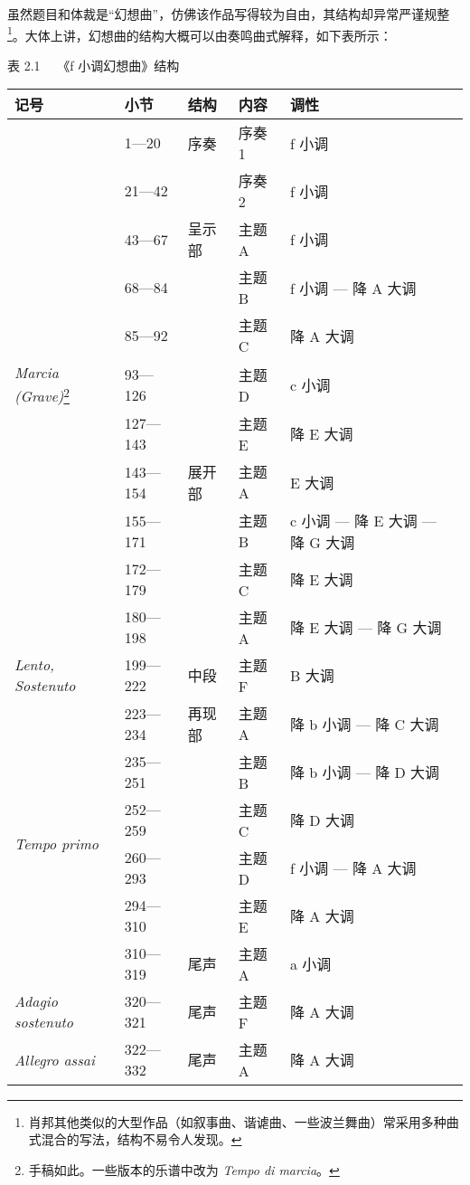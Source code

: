     虽然题目和体裁是“幻想曲”，仿佛该作品写得较为自由，其结构却异常严谨规整\footnote{肖邦其他类似的大型作品（如叙事曲、谐谑曲、一些波兰舞曲）常采用多种曲式混合的写法，结构不易令人发现。}。大体上讲，幻想曲的结构大概可以由奏鸣曲式解释，如下表所示：
    \newpage

    \begin{center}
    \heiti \fontsize{10.5}{12.6}\selectfont 表 2.1 \ \ 《f 小调幻想曲》结构
    \end{center}
    \begin{longtable}{|l|l|l|l|l|}
    \hline
        记号 & 小节 & 结构 & 内容 & 调性 \\ \hline
        ~ & 1—20 & 序奏 & 序奏 1 & f 小调 \\ 
        ~ & 21—42 & ~ & 序奏 2 & f 小调 \\ 
        ~ & 43—67 & 呈示部 & 主题 A & f 小调 \\ 
        ~ & 68—84 & ~ & 主题 B & f 小调 — 降 A 大调 \\ 
        ~ & 85—92 & ~ & 主题 C & 降 A 大调 \\ 
        \textit{Marcia (Grave)}\footnote{手稿如此。一些版本的乐谱中改为 \textit{Tempo di marcia}。} & 93—126 & ~ & 主题 D & c 小调 \\ 
        ~ & 127—143 & ~ & 主题 E & 降 E 大调 \\ 
        ~ & 143—154 & 展开部 & 主题 A & E 大调 \\ 
        ~ & 155—171 & ~ & 主题 B & c 小调 — 降 E 大调 — 降 G 大调 \\ 
        ~ & 172—179 & ~ & 主题 C & 降 E 大调 \\ 
        ~ & 180—198 & ~ & 主题 A & 降 E 大调 — 降 G 大调 \\ \hline
        \textit{Lento, Sostenuto} & 199—222 & 中段 & 主题 F & B 大调 \\ \hline
        \multirow{6}{*}{\textit{Tempo primo}} & 223—234 & 再现部 & 主题 A & 降 b 小调 — 降 C 大调 \\ 
        ~ & 235—251 & ~ & 主题 B & 降 b 小调 — 降 D 大调 \\ 
        ~ & 252—259 & ~ & 主题 C & 降 D 大调 \\ 
        ~ & 260—293 & ~ & 主题 D & f 小调 — 降 A 大调 \\ 
        ~ & 294—310 & ~ & 主题 E & 降 A 大调 \\ 
        ~ & 310—319 & 尾声 & 主题 A & a 小调 \\ \hline
        \textit{Adagio sostenuto} & 320—321 & 尾声 & 主题 F & 降 A 大调 \\ \hline
        \textit{Allegro assai} & 322—332 & 尾声 & 主题 A & 降 A 大调 \\ \hline
    \end{longtable}


